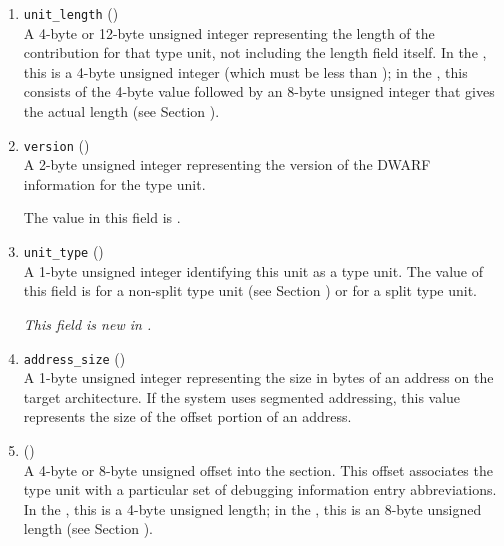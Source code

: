 \begin{enumerate}[1. ]
\item \texttt{unit\_length} () \\
A 4-byte or 12-byte unsigned integer 
representing the length
of the \dotdebuginfo{} contribution for that type unit,
not including the length field itself. In the \thirtytwobitdwarfformat, 
this is a 4-byte unsigned integer (which must be
less than \xfffffffzero); in the \sixtyfourbitdwarfformat, this
consists of the 4-byte value \wffffffff followed by an 
8-byte unsigned integer that gives the actual length
(see Section ).

\item  \texttt{version} (\HFTuhalf) \\
A 2-byte unsigned integer representing the version of the
DWARF information for the type unit.
 
The value in this field is \versiondotdebuginfo.

\item \texttt{unit\_type} (\HFTubyte) \\
A 1-byte unsigned integer identifying this unit as a type unit.
The value of this field is \DWUTtype{} for a non-split type unit
(see Section )
or \DWUTsplittype{} for a split type unit.

\textit{This field is new in \DWARFVersionV.}

\item \texttt{address\_size} (\HFTubyte) \\
A 1-byte unsigned integer representing the size 
in bytes of
an address on the target architecture. If the system uses
segmented addressing, this value represents the size of the
offset portion of an address.

\item \HFNdebugabbrevoffset{} () \\
A 
4-byte or 8-byte unsigned offset into the 
\dotdebugabbrev{}
section. This offset associates the type unit with a
particular set of debugging information entry abbreviations. In
the \thirtytwobitdwarfformat, this is a 4-byte unsigned length;
in the \sixtyfourbitdwarfformat, this is an 8-byte unsigned length
(see Section ).


\end{enumerate}
